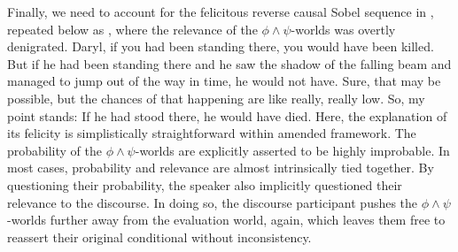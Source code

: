 Finally, we need to account for the felicitous reverse causal Sobel sequence in , repeated below as , where the relevance of the $\phi\land\psi$-worlds was overtly denigrated. 
\pex{}
	\a{}Daryl, if you had been standing there, you would have been killed.
	\a{}But if he had been standing there and he saw the shadow of the falling beam and managed to jump out of the way in time, he would not have.
	\a{}Sure, that may be possible, but the chances of that happening are like really, really low. So, my point stands: If he had stood there, he would have died.\hfill\parencite[adapted and modified from][p. 134]{Klecha2014}
\xe
Here, the explanation of its felicity is simplistically straightforward within  amended framework. The probability of the $\phi\land\psi$-worlds are explicitly asserted to be highly improbable. In most cases, probability and relevance are almost intrinsically tied together.  By questioning their probability, the speaker also implicitly questioned their relevance to the discourse. In doing so, the discourse participant pushes the $\phi\land\psi$-worlds further away from the evaluation world, again, which leaves them free to reassert their original conditional without inconsistency. 

